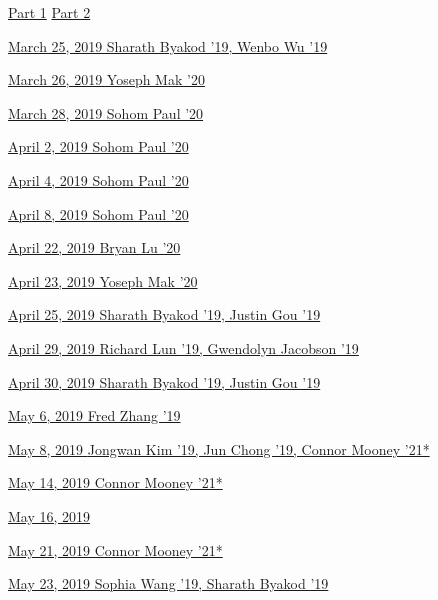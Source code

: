 {\qquad \hyperref[21-0321-1]{Part 1} \qquad 
\hyperref[21-0321-2]{Part 2}

\hyperref[22-0325]{March 25, 2019 \dotfill Sharath Byakod '19, Wenbo Wu '19}

\hyperref[23-0326]{March 26, 2019 \dotfill Yoseph Mak '20}

\hyperref[24-0328]{March 28, 2019 \dotfill Sohom Paul '20}

\hyperref[25-0402]{April 2, 2019 \dotfill Sohom Paul '20}

\hyperref[26-0404]{April 4, 2019 \dotfill Sohom Paul '20}

\hyperref[27-0408]{April 8, 2019 \dotfill Sohom Paul '20}

\hyperref[30-0422]{April 22, 2019 \dotfill Bryan Lu '20}

\hyperref[31-0423]{April 23, 2019 \dotfill Yoseph Mak '20}

\hyperref[32-0425]{April 25, 2019 \dotfill Sharath Byakod '19, Justin Gou '19}

\hyperref[33-0429]{April 29, 2019 \dotfill Richard Lun '19, Gwendolyn Jacobson '19}

\hyperref[34-0430]{April 30, 2019 \dotfill Sharath Byakod '19, Justin Gou '19}

\hyperref[36-0506]{May 6, 2019 \dotfill Fred Zhang '19}

\hyperref[37-0508]{May 8, 2019 \dotfill \small{Jongwan Kim '19, Jun Chong '19, Connor Mooney '21*}}

\hyperref[39-0514]{May 14, 2019 \dotfill Connor Mooney '21*}

\hyperref[40-0516]{May 16, 2019 }

\hyperref[41-0521]{May 21, 2019 \dotfill Connor Mooney '21*}

\hyperref[42-0523]{May 23, 2019 \dotfill Sophia Wang '19, Sharath Byakod '19}
}
